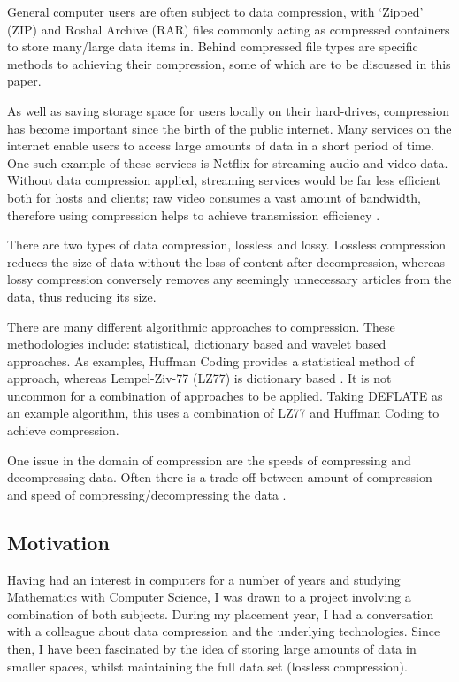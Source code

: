 \documentclass[12pt]{article}
\begin{document}
	General computer users are often subject to data compression, with `Zipped' (ZIP) and Roshal Archive (RAR) files commonly acting as compressed containers to store many/large data items in. Behind compressed file types are specific methods to achieving their compression, some of which are to be discussed in this paper.
	
	As well as saving storage space for users locally on their hard-drives, compression has become important since the birth of the public  internet. Many services on the internet enable users to access large amounts of data in a short period of time. One such example of these services is Netflix for streaming audio and video data. Without data compression applied, streaming services would be far less efficient both for hosts and clients; raw video consumes a vast amount of bandwidth, therefore using compression helps to achieve transmission efficiency \citep{internet_video_streaming}. 
	
	There are two types of data compression, lossless and lossy. Lossless compression reduces the size of data without the loss of content after decompression, whereas lossy compression conversely removes any seemingly unnecessary articles from the data, thus reducing its size.
	
	There are many different algorithmic approaches to compression. These methodologies include: statistical, dictionary based and wavelet based approaches. As examples, Huffman Coding provides a statistical method of approach, whereas Lempel-Ziv-77 (LZ77) is dictionary based \citep{dc_complete_ref}. It is not uncommon for a combination of approaches to be applied. Taking DEFLATE as an example algorithm, this uses a combination of LZ77 and Huffman Coding to achieve compression.
	
	One issue in the domain of compression are the speeds of compressing and decompressing data. Often there is a trade-off between amount of compression and speed of compressing/decompressing the data \citep[p.~5]{dc_complete_ref}. 
	
	
	\subsection{Motivation}
	Having had an interest in computers for a number of years and studying Mathematics with Computer Science, I was drawn to a project involving a combination of both subjects. During my placement year, I had a conversation with a colleague about data compression and the underlying technologies. Since then, I have been fascinated by the idea of storing large amounts of data in smaller spaces, whilst maintaining the full data set (lossless compression).
	
\end{document}
